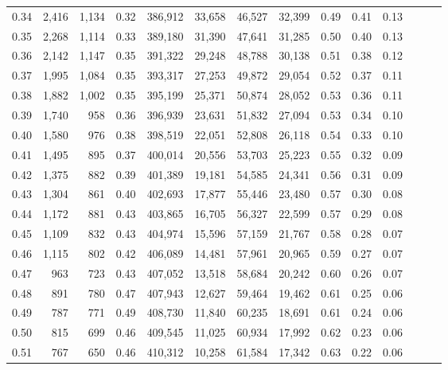 \begin{tabular}{rrrrrrrrrrrrrr}
0.34 &   2,416 &  1,134 &  0.32 &  386,912 &   33,658 &  46,527 &  32,399 &  0.49 &  0.41 &      0.13 \\
0.35 &   2,268 &  1,114 &  0.33 &  389,180 &   31,390 &  47,641 &  31,285 &  0.50 &  0.40 &      0.13 \\
0.36 &   2,142 &  1,147 &  0.35 &  391,322 &   29,248 &  48,788 &  30,138 &  0.51 &  0.38 &      0.12 \\
0.37 &   1,995 &  1,084 &  0.35 &  393,317 &   27,253 &  49,872 &  29,054 &  0.52 &  0.37 &      0.11 \\
0.38 &   1,882 &  1,002 &  0.35 &  395,199 &   25,371 &  50,874 &  28,052 &  0.53 &  0.36 &      0.11 \\
0.39 &   1,740 &    958 &  0.36 &  396,939 &   23,631 &  51,832 &  27,094 &  0.53 &  0.34 &      0.10 \\
0.40 &   1,580 &    976 &  0.38 &  398,519 &   22,051 &  52,808 &  26,118 &  0.54 &  0.33 &      0.10 \\
0.41 &   1,495 &    895 &  0.37 &  400,014 &   20,556 &  53,703 &  25,223 &  0.55 &  0.32 &      0.09 \\
0.42 &   1,375 &    882 &  0.39 &  401,389 &   19,181 &  54,585 &  24,341 &  0.56 &  0.31 &      0.09 \\
0.43 &   1,304 &    861 &  0.40 &  402,693 &   17,877 &  55,446 &  23,480 &  0.57 &  0.30 &      0.08 \\
0.44 &   1,172 &    881 &  0.43 &  403,865 &   16,705 &  56,327 &  22,599 &  0.57 &  0.29 &      0.08 \\
0.45 &   1,109 &    832 &  0.43 &  404,974 &   15,596 &  57,159 &  21,767 &  0.58 &  0.28 &      0.07 \\
0.46 &   1,115 &    802 &  0.42 &  406,089 &   14,481 &  57,961 &  20,965 &  0.59 &  0.27 &      0.07 \\
0.47 &     963 &    723 &  0.43 &  407,052 &   13,518 &  58,684 &  20,242 &  0.60 &  0.26 &      0.07 \\
0.48 &     891 &    780 &  0.47 &  407,943 &   12,627 &  59,464 &  19,462 &  0.61 &  0.25 &      0.06 \\
0.49 &     787 &    771 &  0.49 &  408,730 &   11,840 &  60,235 &  18,691 &  0.61 &  0.24 &      0.06 \\
0.50 &     815 &    699 &  0.46 &  409,545 &   11,025 &  60,934 &  17,992 &  0.62 &  0.23 &      0.06 \\
0.51 &     767 &    650 &  0.46 &  410,312 &   10,258 &  61,584 &  17,342 &  0.63 &  0.22 &      0.06 \\

\end{tabular}
